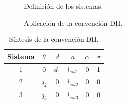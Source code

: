 \documentclass[a4paper,12pt]{article}
\begin{document}
\begin{figure}[H]
    \centering
    \begin{adjustbox}{scale = 0.66, max width=\columnwidth}
    \end{adjustbox}
    \caption{Definición de los sistemas.}
\end{figure}

\begin{figure}[H]
    \centering
    \begin{adjustbox}{scale = 0.66, max width=\columnwidth}
    \end{adjustbox}
    \caption{Aplicación de la convención DH.}
\end{figure}

\begin{table}[H]
    \centering
    \begin{tabular}{|c|c|c|c|c|c|}
    \hline
    Sistema & $\theta$  & $d$ & $a$         & $\alpha$ & $\sigma$ \\ \hline
    1       & $0$       & $d_1$ & $l_{esl1}$  & 0      & 1        \\ \hline
    2       & $q_2$     & 0   & $l_{esl2}$  & 0        & 0        \\ \hline
    3       & $q_3$     & 0   & $l_{esl3}$  & 0        & 0        \\ \hline
    \end{tabular}
    \caption{Síntesis de la convención DH.}
\end{table}
\end{document}
